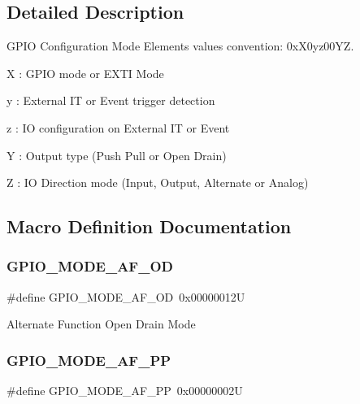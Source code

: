 \subsection{Detailed Description}
G\+P\+IO Configuration Mode Elements values convention\+: 0x\+X0yz00\+YZ. 


\begin{DoxyItemize}
\item X \+: G\+P\+IO mode or E\+X\+TI Mode
\item y \+: External IT or Event trigger detection
\item z \+: IO configuration on External IT or Event
\item Y \+: Output type (Push Pull or Open Drain)
\item Z \+: IO Direction mode (Input, Output, Alternate or Analog) 
\end{DoxyItemize}

\subsection{Macro Definition Documentation}
\mbox{\label{group___g_p_i_o__mode__define_ga282b9fd37c8ef31daba314ffae6bf023}} 
\subsubsection{\texorpdfstring{G\+P\+I\+O\+\_\+\+M\+O\+D\+E\+\_\+\+A\+F\+\_\+\+OD}{GPIO\_MODE\_AF\_OD}}
{\footnotesize\ttfamily \#define G\+P\+I\+O\+\_\+\+M\+O\+D\+E\+\_\+\+A\+F\+\_\+\+OD~0x00000012U}

Alternate Function Open Drain Mode \mbox{\label{group___g_p_i_o__mode__define_ga526c72c5264316fc05c775b6cad4aa6a}} 
\subsubsection{\texorpdfstring{G\+P\+I\+O\+\_\+\+M\+O\+D\+E\+\_\+\+A\+F\+\_\+\+PP}{GPIO\_MODE\_AF\_PP}}
{\footnotesize\ttfamily \#define G\+P\+I\+O\+\_\+\+M\+O\+D\+E\+\_\+\+A\+F\+\_\+\+PP~0x00000002U}

